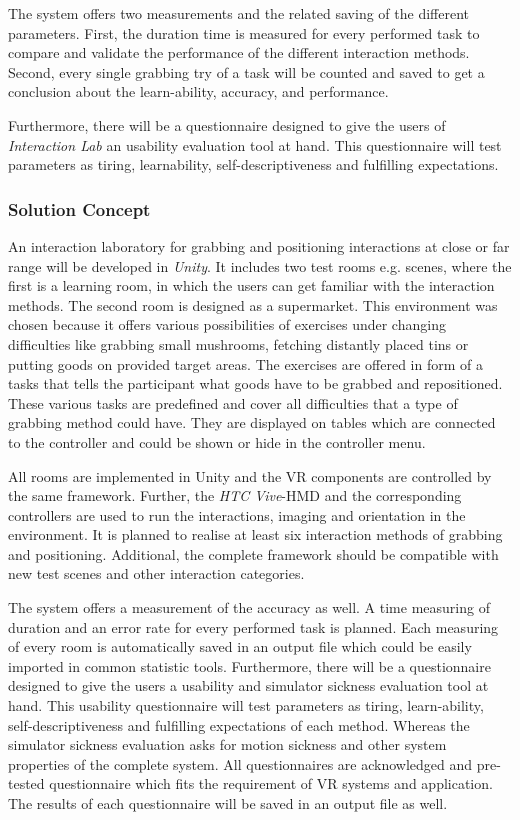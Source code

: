 The system offers two measurements and the related saving of the different parameters. First, the duration time is measured for every performed task to compare and validate the performance of the different interaction methods. Second, every single grabbing try of a task will be counted and saved to get a conclusion about the learn-ability, accuracy, and performance.

Furthermore, there will be a questionnaire designed to give the users of \textit{Interaction Lab} an usability evaluation tool at hand. This questionnaire will test parameters as tiring, learnability, self-descriptiveness and fulfilling expectations.


\subsubsection{Solution Concept}\label{sec:Projectconcept}
An interaction laboratory for grabbing and positioning interactions at close or far range will be developed in \textit{Unity}. It includes two test rooms e.g. scenes, where the first is a learning room, in which the users can get familiar with the interaction methods. The second room is designed as a supermarket. This environment was chosen because it offers various possibilities of exercises under changing difficulties like grabbing small mushrooms, fetching distantly placed tins or putting goods on provided target areas. The exercises are offered in form of a tasks that tells the participant what goods have to be grabbed and repositioned. These various tasks are predefined and cover all difficulties that a type of grabbing method could have. They are displayed on tables which are connected to the controller and could be shown or hide in the controller menu. 

All rooms are implemented in Unity and the VR components are controlled by the same framework. Further, the \textit{HTC Vive}-HMD and the corresponding controllers are used to run the interactions, imaging and orientation in the environment. It is planned to realise at least six interaction methods of grabbing and positioning. Additional, the complete framework should be compatible with new test scenes and other interaction categories. 

The system offers a measurement of the accuracy as well. A time measuring of duration and an error rate for every performed task is planned. Each measuring of every room is automatically saved in an output file which could be easily imported in common statistic tools. Furthermore, there will be a questionnaire designed to give the users a usability and simulator sickness evaluation tool at hand. This usability questionnaire will test parameters as tiring, learn-ability, self-descriptiveness and fulfilling expectations of each method. Whereas the simulator sickness evaluation asks for motion sickness and other system properties of the complete system. All questionnaires are acknowledged and pre-tested questionnaire which fits the requirement of VR systems and application. The results of each questionnaire will be saved in an output file as well.

